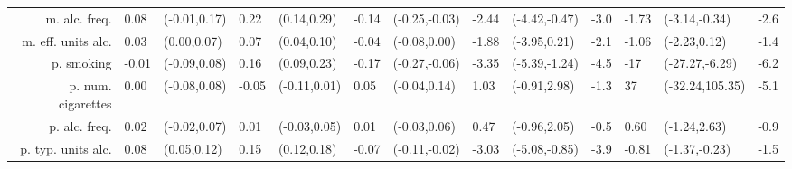 \begin{tabular}{rLlLlLlLlLLlL}
m. alc.  freq. & 0.08 & (-0.01,0.17) & 0.22 & (0.14,0.29) & -0.14 & (-0.25,-0.03) & -2.44 & (-4.42,-0.47) & -3.0 & -1.73 & (-3.14,-0.34) & -2.6 \\
m. eff. units alc. & 0.03 & (0.00,0.07) & 0.07 & (0.04,0.10) & -0.04 & (-0.08,0.00) & -1.88 & (-3.95,0.21) & -2.1 & -1.06 & (-2.23,0.12) & -1.4 \\
p. smoking & -0.01 & (-0.09,0.08) & 0.16 & (0.09,0.23) & -0.17 & (-0.27,-0.06) & -3.35 & (-5.39,-1.24) & -4.5 & -17 & (-27.27,-6.29) & -6.2 \\
p. num. cigarettes & 0.00 & (-0.08,0.08) & -0.05 & (-0.11,0.01) & 0.05 & (-0.04,0.14) & 1.03 & (-0.91,2.98) & -1.3 & 37 & (-32.24,105.35) & -5.1 \\
p. alc.  freq. & 0.02 & (-0.02,0.07) & 0.01 & (-0.03,0.05) & 0.01 & (-0.03,0.06) & 0.47 & (-0.96,2.05) & -0.5 & 0.60 & (-1.24,2.63) & -0.9 \\
p. typ. units alc. & 0.08 & (0.05,0.12) & 0.15 & (0.12,0.18) & -0.07 & (-0.11,-0.02) & -3.03 & (-5.08,-0.85) & -3.9 & -0.81 & (-1.37,-0.23) & -1.5 \\

\hline
\end{tabular}
